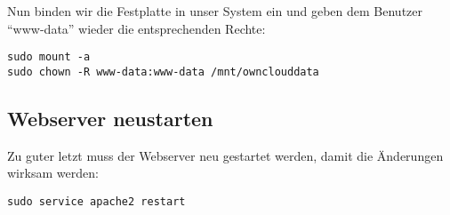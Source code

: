 Nun binden wir die Festplatte in unser System ein und geben dem Benutzer ``www-data'' wieder die entsprechenden Rechte:

\begin{lstlisting}
sudo mount -a
sudo chown -R www-data:www-data /mnt/ownclouddata
\end{lstlisting}

\subsection{Webserver neustarten}
Zu guter letzt muss der Webserver neu gestartet werden, damit die Änderungen wirksam werden:

\begin{lstlisting}
sudo service apache2 restart
\end{lstlisting}
